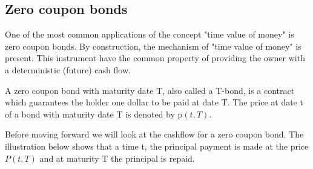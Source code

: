 \subsection{Zero coupon bonds}
One of the most common applications of the concept "time value of money" is zero coupon bonds. 
By construction, the mechanism of "time value of money" is present. This instrument 
have the common property of providing the owner with a deterministic (future) cash flow. 
\begin{definition}\label{def:zcb}
    A zero coupon bond with maturity date T, also called a T-bond, is a contract which 
    guarantees the holder one dollar to be paid at date T. The price at date t of 
    a bond with maturity date T is denoted by p$(t,T)$. \cite{Bjork} 
\end{definition} 
\noindent
Before moving forward we will look at the cashflow for a zero coupon bond. The illustration below shows that a time t,
the principal payment is made at the price $P(t,T)$ and at maturity T the principal is repaid.
\begin{center}
\end{center}
